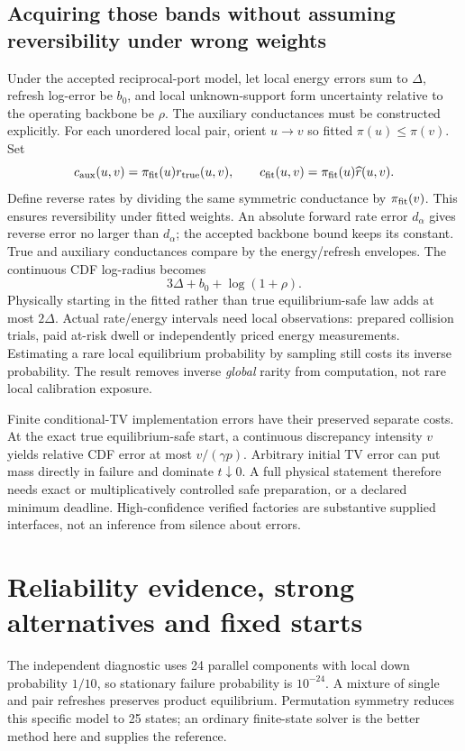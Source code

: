 \documentclass[11pt]{article}
\begin{document}
\subsection{Acquiring those bands without assuming reversibility under wrong weights}
Under the accepted reciprocal-port model, let local energy errors sum to \(\Delta\), refresh log-error be \(b_0\), and local unknown-support form uncertainty relative to the operating backbone be \(\rho\). The auxiliary conductances must be constructed explicitly. For each unordered local pair, orient \(u\to v\) so fitted \(\pi(u)\le\pi(v)\). Set
\[
 c_{\rm aux}(u,v)=\pi_{\rm fit}(u)r_{\rm true}(u,v),\qquad
 c_{\rm fit}(u,v)=\pi_{\rm fit}(u)\widehat r(u,v).
\]
Define reverse rates by dividing the same symmetric conductance by \(\pi_{\rm fit}(v)\). This ensures reversibility under fitted weights. An absolute forward rate error \(d_\alpha\) gives reverse error no larger than \(d_\alpha\); the accepted backbone bound keeps its constant. True and auxiliary conductances compare by the energy/refresh envelopes. The continuous CDF log-radius becomes
\[
 3\Delta+b_0+\log(1+\rho).
\]
Physically starting in the fitted rather than true equilibrium-safe law adds at most \(2\Delta\). Actual rate/energy intervals need local observations: prepared collision trials, paid at-risk dwell or independently priced energy measurements. Estimating a rare local equilibrium probability by sampling still costs its inverse probability. The result removes inverse \emph{global} rarity from computation, not rare local calibration exposure.

Finite conditional-TV implementation errors have their preserved separate costs. At the exact true equilibrium-safe start, a continuous discrepancy intensity \(v\) yields relative CDF error at most \(v/(\gamma p)\). Arbitrary initial TV error can put mass directly in failure and dominate \(t\downarrow0\). A full physical statement therefore needs exact or multiplicatively controlled safe preparation, or a declared minimum deadline. High-confidence verified factories are substantive supplied interfaces, not an inference from silence about errors.

\section{Reliability evidence, strong alternatives and fixed starts}
The independent diagnostic uses 24 parallel components with local down probability \(1/10\), so stationary failure probability is \(10^{-24}\). A mixture of single and pair refreshes preserves product equilibrium. Permutation symmetry reduces this specific model to 25 states; an ordinary finite-state solver is the better method here and supplies the reference.
\end{document}
